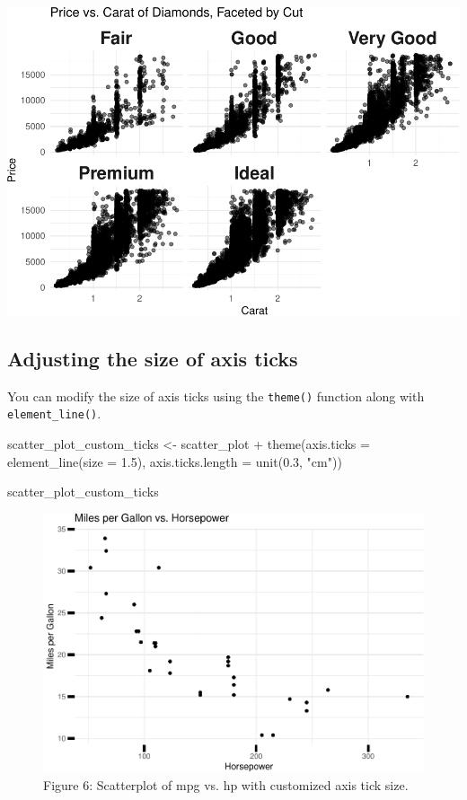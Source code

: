\documentclass[
]{book}
\newenvironment{Shaded}{\begin{snugshade}}{\end{snugshade}}
\newcommand{\AttributeTok}[1]{\textcolor[rgb]{0.77,0.63,0.00}{#1}}
\newcommand{\FloatTok}[1]{\textcolor[rgb]{0.00,0.00,0.81}{#1}}
\newcommand{\FunctionTok}[1]{\textcolor[rgb]{0.00,0.00,0.00}{#1}}
\newcommand{\NormalTok}[1]{#1}
\newcommand{\OtherTok}[1]{\textcolor[rgb]{0.56,0.35,0.01}{#1}}
\newcommand{\SpecialCharTok}[1]{\textcolor[rgb]{0.00,0.00,0.00}{#1}}
\newcommand{\StringTok}[1]{\textcolor[rgb]{0.31,0.60,0.02}{#1}}
\begin{document}
\includegraphics[width=1\linewidth]{graphformatting_files/figure-latex/unnamed-chunk-12-1}

\hypertarget{adjusting-the-size-of-axis-ticks}{%
\subsection{Adjusting the size of axis ticks}\label{adjusting-the-size-of-axis-ticks}}

You can modify the size of axis ticks using the \texttt{theme()} function along with \texttt{element\_line()}.

\begin{Shaded}
\begin{Highlighting}[]
\NormalTok{scatter\_plot\_custom\_ticks }\OtherTok{\textless{}{-}}\NormalTok{ scatter\_plot }\SpecialCharTok{+}
  \FunctionTok{theme}\NormalTok{(}\AttributeTok{axis.ticks =} \FunctionTok{element\_line}\NormalTok{(}\AttributeTok{size =} \FloatTok{1.5}\NormalTok{),}
        \AttributeTok{axis.ticks.length =} \FunctionTok{unit}\NormalTok{(}\FloatTok{0.3}\NormalTok{, }\StringTok{"cm"}\NormalTok{))}

\NormalTok{scatter\_plot\_custom\_ticks}
\end{Highlighting}
\end{Shaded}

\begin{figure}
\includegraphics[width=1\linewidth]{graphformatting_files/figure-latex/fig6-1} \caption{Figure 6: Scatterplot of mpg vs. hp with customized axis tick size.}\label{fig:fig6}
\end{figure}
\end{document}
